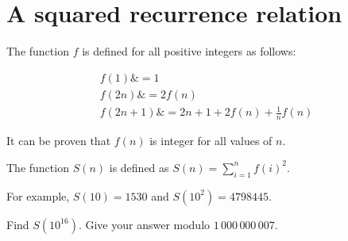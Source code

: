 \section[Problem \#759: A squared recurrence relation]{A squared recurrence relation}
\label{sec:problem_759}

The function $f$ is defined for all positive integers
as follows:

\begin{align*}
f(1) \&= 1\\
f(2n) \&= 2f(n)\\
f(2n+1) \&= 2n+1 + 2f(n)+\tfrac{1}{n}f(n)
\end{align*}

It can be proven that $f(n)$ is integer for all values of
$n$.

The function $S(n)$ is defined as $S(n) = \displaystyle \sum_{i=1}^n f(i) ^2$.

For example, $S(10)=1530$ and $S(10^2)=4798445$.

Find $S(10^{16})$. Give your answer modulo $1\,000\,000\,007$.